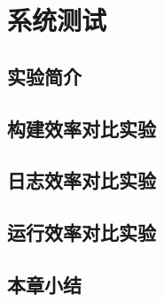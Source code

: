 \chapter{系统测试}  
\label{chp:testing}


\section{实验简介}
\section{构建效率对比实验}
\section{日志效率对比实验}
\section{运行效率对比实验}
 \section{本章小结}
